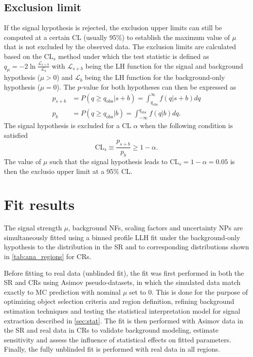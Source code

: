 \documentclass[../thesis.tex]{subfiles}
\begin{document}
\subsection{Exclusion limit}
If the signal hypothesis is rejected, the exclusion upper limits can still be computed at a certain \acs{CL} (usually 95\%) to establish the maximum value of $\mu$ that is not excluded by the observed data. The exclusion limits are calculated based on the $\text{CL}_s$ method \citep{cls1,cls2} under which the test statistic is defined as $q_\mu = -2 \ln \frac{\mathcal{L}_{s+b}}{\mathcal{L}_b}$ with $\mathcal{L}_{s+b}$ being the \acs{LH} function for the signal and background hypothesis ($\mu>0$) and $\mathcal{L}_b$ being the \acs{LH} function for the background-only hypothesis ($\mu=0$). The $p$-value for both hypotheses can then be expressed as
\begin{equation}
\begin{aligned}
p_{s+b} &= P(q\geq q_\text{obs}|s+b)
= \int^\infty_{q_\text{obs}} f(q|s+b)dq \\
p_b 	&= P(q\geq q_\text{obs}|b)
= \int^{q_\text{obs}}_{-\infty} f(q|b)dq.
\end{aligned}
\end{equation}
The signal hypothesis is excluded for a \acs{CL} $\alpha$ when the following condition is satisfied
\begin{equation}
\text{CL}_s \equiv \frac{p_{s+b}}{p_b} \geq 1-\alpha.
\end{equation}
The value of $\mu$ such that the signal hypothesis leads to $\text{CL}_s = 1-\alpha = 0.05$ is then the exclusio upper limit at a 95\% \acs{CL}.

\section{Fit results}
\label{sec:results}

The signal strength $\mu$, background \acs{NF}s, \ttW scaling factors and uncertainty \acs{NP}s are simultaneously fitted using a binned profile \acs{LLH} fit under the background-only hypothesis to the \HT distribution in the \acs{SR} and to corresponding distributions shown in \autoref{tab:ana_regions} for \acs{CR}s. 

Before fitting to real data (unblinded fit), the fit was first performed in both the \acs{SR} and \acs{CR}s using Asimov pseudo-datasets, in which the simulated data match exactly to \acs{MC} prediction with nominal $\mu$ set to 0. This is done for the purpose of optimizing object selection criteria and region definition, refining background estimation techniques and testing the statistical interpretation model for signal extraction described in \autoref{sec:stat}. The fit is then performed with Asimov data in the \acs{SR} and real data in \acs{CR}s to validate background modeling, estimate sensitivity and assess the influence of statistical effects on fitted parameters. Finally, the fully unblinded fit is performed with real data in all regions.
\end{document}
